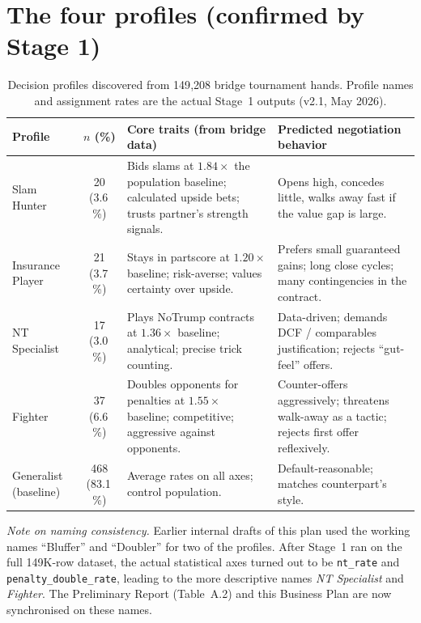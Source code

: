 \documentclass[11pt, a4paper, oneside]{report}
\begin{document}
\section{The four profiles (confirmed by Stage 1)}

\begin{table}[H]
\centering\small
\caption{Decision profiles discovered from 149{,}208 bridge tournament hands.
Profile names and assignment rates are the actual Stage~1 outputs (v2.1, May 2026).}
\label{tab:profiles}
\begin{tabularx}{\textwidth}{l c X X}
\toprule
\textbf{Profile} & \textbf{$n$ (\%)} & \textbf{Core traits (from bridge data)} & \textbf{Predicted negotiation behavior} \\
\midrule
Slam Hunter
  & 20 (3.6\,\%)
  & Bids slams at $1.84\times$ the population baseline; calculated upside bets; trusts partner's strength signals.
  & Opens high, concedes little, walks away fast if the value gap is large. \\
Insurance Player
  & 21 (3.7\,\%)
  & Stays in partscore at $1.20\times$ baseline; risk-averse; values certainty over upside.
  & Prefers small guaranteed gains; long close cycles; many contingencies in the contract. \\
NT Specialist
  & 17 (3.0\,\%)
  & Plays NoTrump contracts at $1.36\times$ baseline; analytical; precise trick counting.
  & Data-driven; demands DCF / comparables justification; rejects ``gut-feel'' offers. \\
Fighter
  & 37 (6.6\,\%)
  & Doubles opponents for penalties at $1.55\times$ baseline; competitive; aggressive against opponents.
  & Counter-offers aggressively; threatens walk-away as a tactic; rejects first offer reflexively. \\
\midrule
Generalist (baseline)
  & 468 (83.1\,\%)
  & Average rates on all axes; control population.
  & Default-reasonable; matches counterpart's style. \\
\bottomrule
\end{tabularx}
\end{table}

\noindent\textit{Note on naming consistency.} Earlier internal drafts of this plan used the working names ``Bluffer'' and ``Doubler'' for two of the profiles. After Stage~1 ran on the full 149K-row dataset, the actual statistical axes turned out to be \texttt{nt\_rate} and \texttt{penalty\_double\_rate}, leading to the more descriptive names \emph{NT Specialist} and \emph{Fighter}. The Preliminary Report (Table~A.2) and this Business Plan are now synchronised on these names.
\end{document}
